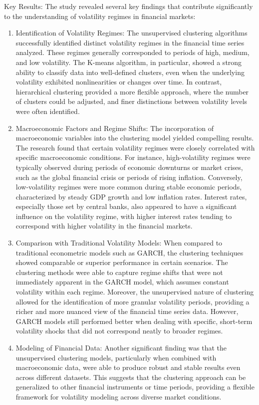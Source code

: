 Key Results:
The study revealed several key findings that contribute significantly to the understanding of volatility regimes in financial markets:

\begin{enumerate}

\item Identification of Volatility Regimes: The unsupervised clustering algorithms successfully identified distinct volatility regimes in the financial time series analyzed. These regimes generally corresponded to periods of high, medium, and low volatility. The K-means algorithm, in particular, showed a strong ability to classify data into well-defined clusters, even when the underlying volatility exhibited nonlinearities or changes over time. In contrast, hierarchical clustering provided a more flexible approach, where the number of clusters could be adjusted, and finer distinctions between volatility levels were often identified.
\item Macroeconomic Factors and Regime Shifts: The incorporation of macroeconomic variables into the clustering model yielded compelling results. The research found that certain volatility regimes were closely correlated with specific macroeconomic conditions. For instance, high-volatility regimes were typically observed during periods of economic downturns or market crises, such as the global financial crisis or periods of rising inflation. Conversely, low-volatility regimes were more common during stable economic periods, characterized by steady GDP growth and low inflation rates. Interest rates, especially those set by central banks, also appeared to have a significant influence on the volatility regime, with higher interest rates tending to correspond with higher volatility in the financial markets.
\item Comparison with Traditional Volatility Models: When compared to traditional econometric models such as GARCH, the clustering techniques showed comparable or superior performance in certain scenarios. The clustering methods were able to capture regime shifts that were not immediately apparent in the GARCH model, which assumes constant volatility within each regime. Moreover, the unsupervised nature of clustering allowed for the identification of more granular volatility periods, providing a richer and more nuanced view of the financial time series data. However, GARCH models still performed better when dealing with specific, short-term volatility shocks that did not correspond neatly to broader regimes.
\item Modeling of Financial Data: Another significant finding was that the unsupervised clustering models, particularly when combined with macroeconomic data, were able to produce robust and stable results even across different datasets. This suggests that the clustering approach can be generalized to other financial instruments or time periods, providing a flexible framework for volatility modeling across diverse market conditions.

\end{enumerate}

